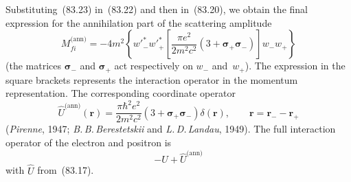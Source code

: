 Substituting~(83.23) in~(83.22) and then in~(83.20), we obtain the final expression for the annihilation part of the scattering amplitude
\begin{equation}
M_{fi}^\text{(ann)} = -4m^2\left\{w'^*_- w'^*_+\left[\frac{\pi e^2}{2m^2c^2}(3+\boldsymbol{\sigma}_+\boldsymbol{\sigma}_-)\right]w_- w_+\right\}
\end{equation}
(the matrices $\boldsymbol{\sigma}_-$ and $\boldsymbol{\sigma}_+$ act respectively on $w_-$ and~$w_+$). The expression in the square brackets represents the interaction operator in the momentum representation. The corresponding coordinate operator
\begin{equation}
\hat{U}^\text{(ann)}(\mathbf{r}) = \frac{\pi\hbar^2 e^2}{2m^2c^2}(3+\boldsymbol{\sigma}_+\boldsymbol{\sigma}_-)\delta(\mathbf{r}),\qquad \mathbf{r} = \mathbf{r}_- - \mathbf{r}_+
\tag{83.24}
\end{equation}
(\textit{Pirenne}, 1947; \textit{B.\,B.\,Berestetskii} and \textit{L.\,D.\,Landau}, 1949). The full interaction operator of the electron and positron is
\[
-\hat{U} + \hat{U}^\text{(ann)}
\]
with $\hat{U}$ from~(83.17).

